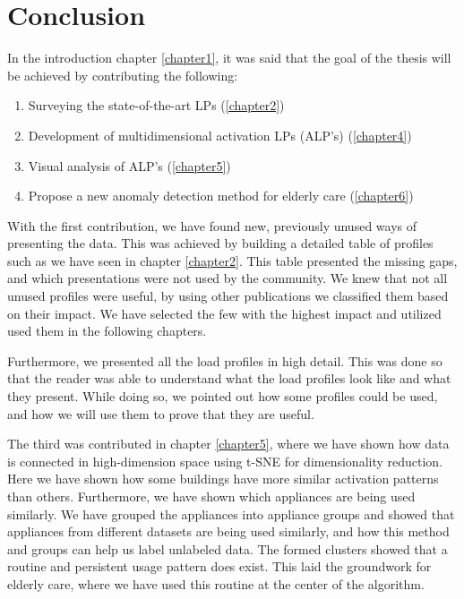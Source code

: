 
\chapter{Conclusion} %
\label{chapter7} %

In the introduction chapter \ref{chapter1}, it was said that the goal of the thesis will be achieved by contributing the following:


\begin{enumerate}
	\item Surveying the state-of-the-art LPs (\ref{chapter2})
	\item Development of multidimensional activation LPs (ALP's) (\ref{chapter4})
	\item Visual analysis of ALP's (\ref{chapter5})
	\item Propose a new anomaly detection method for elderly care (\ref{chapter6})
\end{enumerate}


With the first contribution, we have found new, previously unused ways of presenting the data.
This was achieved by building a detailed table of profiles such as we have seen in chapter \ref{chapter2}.
This table presented the missing gaps, and which presentations were not used by the community.
We knew that not all unused profiles were useful, by using other publications we classified them based on their impact. 
We have selected the few with the highest impact and utilized used them in the following chapters.

Furthermore, we presented all the load profiles in high detail. This was done so that the reader was able to understand what the load profiles look like and what they present.
While doing so, we pointed out how some profiles could be used, and how we will use them to prove that they are useful. 

The third was contributed in chapter \ref{chapter5}, where we have shown how data is connected in high-dimension space
using t-SNE for dimensionality reduction. Here we have shown how some buildings have more similar activation patterns than others.
Furthermore, we have shown which appliances are being used similarly. 
We have grouped the appliances into appliance groups and showed that appliances from different datasets are being used similarly, and how this method and groups can help us label unlabeled data. 
The formed clusters showed that a routine and persistent usage pattern does exist. This laid the groundwork for elderly care, where we have used this routine at the center of the algorithm.

